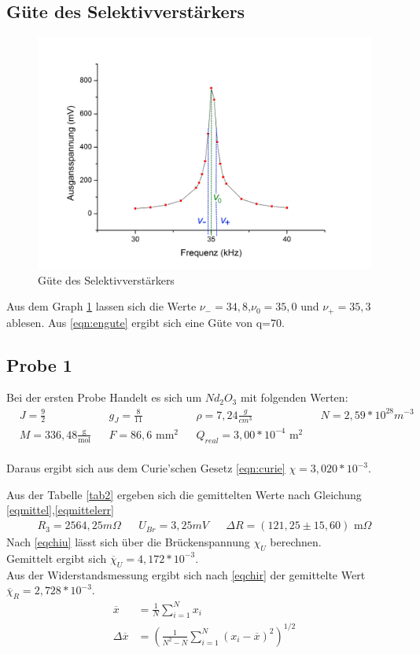\subsection{Güte des Selektivverstärkers}

\begin{figure}[h]
		\begin{center}
		\includegraphics[scale=0.4]{gute.jpg}
		\caption{Güte des Selektivverstärkers}
		\label{gute}
		\end{center}	
\end{figure}

Aus dem Graph \ref{gute} lassen sich die Werte $\nu_-=34,8$,$\nu_0=35,0$ und $\nu_+=35,3$ ablesen. Aus \eqref{eqn:engute} ergibt sich eine Güte von q=70.

\subsection{Probe 1}
Bei der ersten Probe Handelt es sich um $Nd_2O_3$ mit folgenden Werten\cite{tafel}:
\begin{align*}
&J=\frac92&
&g_J=\frac{8}{11}&
&\rho=7,24\frac{g}{cm^3}&
&N=2,59*10^{28}m^{-3}&\\
&M=336,48\frac{\text{g}}{\text{mol}}&
&F=86,6\text{ mm$^2$}&
&Q_{real}=3,00*10^{-4}\text{ m}^2&
\end{align*}
\\
Daraus ergibt sich aus dem Curie'schen Gesetz \eqref{eqn:curie}
$\chi=3,020*10^{-3}$.

Aus der Tabelle \ref{tab2} ergeben sich die gemittelten Werte nach Gleichung \ref{eqmittel},\ref{eqmittelerr}
\begin{align*}
&R_3=2564,25m\Omega&
&U_{Br}=3,25mV&
&\Delta R=(121,25\pm15,60)\text{ m}\Omega&
\end{align*}
Nach \eqref{eqchiu} lässt sich über die Brückenspannung
$\chi_U$
berechnen. \\Gemittelt ergibt sich $\overline\chi_U=4,172*10^{-3}$.
\\
Aus der Widerstandsmessung ergibt sich nach \eqref{eqchir} der gemittelte Wert
$\overline\chi_R=2,728*10^{-3}$.
\begin{align}
\overline x &=\frac{1}{N} \sum_{i=1}^N x_i\label{eqmittel}\\
\Delta \overline x&= (\frac{1}{N^2-N} \sum_{i=1}^N (x_i - \overline x)^2)^{1/2}\label{eqmittelerr}
\end{align}

